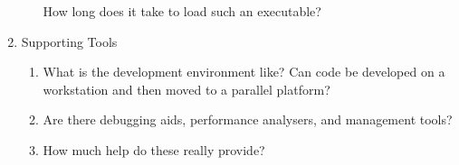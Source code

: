 \begin{enumerate}
\begin{enumerate}
        How long does it take to load such an executable?
  \end{enumerate}
\item Supporting Tools
  \begin{enumerate}
  \item What is the development environment like?
        Can code be developed on a workstation and then moved to a parallel platform?
  \item Are there debugging aids, performance analysers, and management tools?
  \item How much help do these really provide?
  \end{enumerate}
\end{enumerate}

